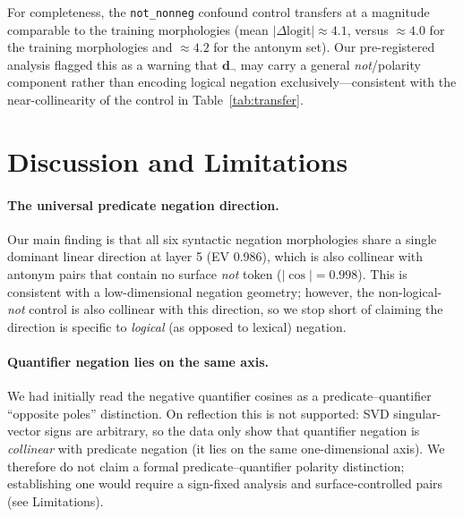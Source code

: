 \documentclass{article}
\begin{document}
For completeness, the \texttt{not\_nonneg} confound control transfers at a magnitude comparable to the training morphologies (mean $|\Delta\text{logit}| \approx 4.1$, versus $\approx 4.0$ for the training morphologies and $\approx 4.2$ for the antonym set). Our pre-registered analysis flagged this as a warning that $\mathbf{d}_{\neg}$ may carry a general \textit{not}/polarity component rather than encoding logical negation exclusively---consistent with the near-collinearity of the control in Table~\ref{tab:transfer}.

\section{Discussion and Limitations}
\label{sec:discussion}

\paragraph{The universal predicate negation direction.}
Our main finding is that all six syntactic negation morphologies share a single dominant linear direction at layer 5 (EV 0.986), which is also collinear with antonym pairs that contain no surface \textit{not} token ($|\cos|=0.998$).
This is consistent with a low-dimensional negation geometry; however, the non-logical-\textit{not} control is also collinear with this direction, so we stop short of claiming the direction is specific to \emph{logical} (as opposed to lexical) negation.

\paragraph{Quantifier negation lies on the same axis.}
We had initially read the negative quantifier cosines as a predicate--quantifier ``opposite poles'' distinction. On reflection this is not supported: SVD singular-vector signs are arbitrary, so the data only show that quantifier negation is \emph{collinear} with predicate negation (it lies on the same one-dimensional axis). We therefore do not claim a formal predicate--quantifier polarity distinction; establishing one would require a sign-fixed analysis and surface-controlled pairs (see Limitations).
\end{document}
